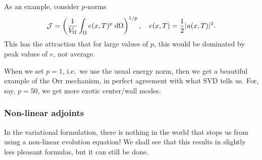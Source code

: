 \documentclass[a4paper]{article}
\begin{document}
As an example, consider $p$-norms
\[
  \mathcal{J} = \left( \frac{1}{V_\Omega} \int_\Omega e(x, T)^p \;\d \Omega\right)^{1/p},\quad e(x, T) = \frac{1}{2} |u(x, T)|^2. %
\]
This has the attraction that for large values of $p$, this would be dominated by peak values of $e$, not average.

When we set $p = 1$, i.e.\ we use the usual energy norm, then we get a beautiful example of the Orr mechanism, in perfect agreement with what SVD tells us. For, say, $p = 50$, we get more exotic center/wall modes. %

%
%
%

\subsubsection*{Non-linear adjoints}
In the variational formulation, there is nothing in the world that stops us from using a non-linear evolution equation! We shall see that this results in slightly less pleasant formulas, but it can still be done.
\end{document}
